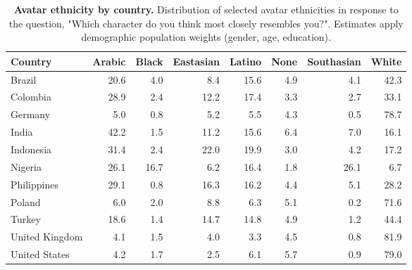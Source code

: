 \begin{table}[!h]
\centering
\caption{\label{tab:avatar-ethnicity-by-country}\textbf{Avatar ethnicity by country.} Distribution of selected avatar ethnicities in response to the question, "Which character do you think most closely resembles you?". Estimates apply demographic population weights (gender, age, education).}
\centering
\begin{tabular}[t]{lrrrrrrr}
\toprule
\textbf{Country} & \textbf{Arabic} & \textbf{Black} & \textbf{Eastasian} & \textbf{Latino} & \textbf{None} & \textbf{Southasian} & \textbf{White}\\
\midrule
Brazil & 20.6 & 4.0 & 8.4 & 15.6 & 4.9 & 4.1 & 42.3\\
Colombia & 28.9 & 2.4 & 12.2 & 17.4 & 3.3 & 2.7 & 33.1\\
Germany & 5.0 & 0.8 & 5.2 & 5.5 & 4.3 & 0.5 & 78.7\\
India & 42.2 & 1.5 & 11.2 & 15.6 & 6.4 & 7.0 & 16.1\\
Indonesia & 31.4 & 2.4 & 22.0 & 19.9 & 3.0 & 4.2 & 17.2\\
Nigeria & 26.1 & 16.7 & 6.2 & 16.4 & 1.8 & 26.1 & 6.7\\
Philippines & 29.1 & 0.8 & 16.3 & 16.2 & 4.4 & 5.1 & 28.2\\
Poland & 6.0 & 2.0 & 8.8 & 6.3 & 5.1 & 0.2 & 71.6\\
Turkey & 18.6 & 1.4 & 14.7 & 14.8 & 4.9 & 1.2 & 44.4\\
United Kingdom & 4.1 & 1.5 & 4.0 & 3.3 & 4.5 & 0.8 & 81.9\\
United States & 4.2 & 1.7 & 2.5 & 6.1 & 5.7 & 0.9 & 79.0\\
\bottomrule
\end{tabular}
\end{table}
